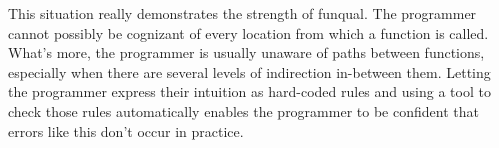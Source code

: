 This situation really demonstrates the strength of funqual.  The programmer cannot possibly be cognizant of every location from which a function is called.  What's more, the programmer is usually unaware of paths between functions, especially when there are several levels of indirection in-between them.  Letting the programmer express their intuition as hard-coded rules and using a tool to check those rules automatically enables the programmer to be confident that errors like this don't occur in practice.  
